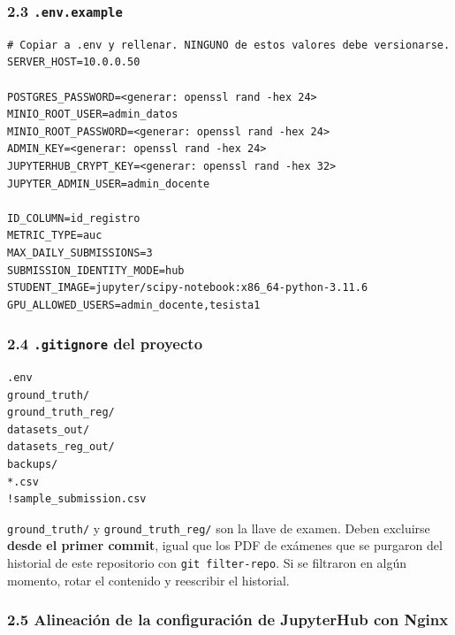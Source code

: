 \documentclass[11pt,a4paper]{article}
\begin{document}
\hypertarget{23-envexample}{%
\subsubsection{\texorpdfstring{2.3 \texttt{.\allowbreak{}env.\allowbreak{}example}}{2.3 .env.example}}\label{23-envexample}}

\begin{lstlisting}
# Copiar a .env y rellenar. NINGUNO de estos valores debe versionarse.
SERVER_HOST=10.0.0.50

POSTGRES_PASSWORD=<generar: openssl rand -hex 24>
MINIO_ROOT_USER=admin_datos
MINIO_ROOT_PASSWORD=<generar: openssl rand -hex 24>
ADMIN_KEY=<generar: openssl rand -hex 24>
JUPYTERHUB_CRYPT_KEY=<generar: openssl rand -hex 32>
JUPYTER_ADMIN_USER=admin_docente

ID_COLUMN=id_registro
METRIC_TYPE=auc
MAX_DAILY_SUBMISSIONS=3
SUBMISSION_IDENTITY_MODE=hub
STUDENT_IMAGE=jupyter/scipy-notebook:x86_64-python-3.11.6
GPU_ALLOWED_USERS=admin_docente,tesista1
\end{lstlisting}

\hypertarget{24-gitignore-del-proyecto}{%
\subsubsection{\texorpdfstring{2.4 \texttt{.\allowbreak{}gitignore} del proyecto}{2.4 .gitignore del proyecto}}\label{24-gitignore-del-proyecto}}

\begin{lstlisting}
.env
ground_truth/
ground_truth_reg/
datasets_out/
datasets_reg_out/
backups/
*.csv
!sample_submission.csv
\end{lstlisting}

\texttt{ground\_\allowbreak{}truth/\allowbreak{}} y \texttt{ground\_\allowbreak{}truth\_\allowbreak{}reg/\allowbreak{}} son la llave de examen. Deben excluirse \textbf{desde el primer commit}, igual que los PDF de exámenes que se purgaron del historial de este repositorio con \texttt{git\ filter-\allowbreak{}repo}. Si se filtraron en algún momento, rotar el contenido y reescribir el historial.

\hypertarget{25-alineaciuxf3n-de-la-configuraciuxf3n-de-jupyterhub-con-nginx}{%
\subsubsection{2.5 Alineación de la configuración de JupyterHub con Nginx}\label{25-alineaciuxf3n-de-la-configuraciuxf3n-de-jupyterhub-con-nginx}}
\end{document}

